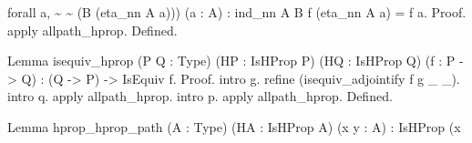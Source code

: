 \begin{coqdoccode}
\begin{coqdoccomment}
forall\coqdocindent{0.50em}
a,\coqdocindent{0.50em}
\~{}\coqdocindent{0.50em}
\~{}\coqdocindent{0.50em}
(B\coqdocindent{0.50em}
(eta\_nn\coqdocindent{0.50em}
A\coqdocindent{0.50em}
a)))\coqdocindent{0.50em}
(a\coqdocindent{0.50em}
:\coqdocindent{0.50em}
A)\coqdocindent{0.50em}
:\coqdoceol
\coqdocindent{2.00em}
ind\_nn\coqdocindent{0.50em}
A\coqdocindent{0.50em}
B\coqdocindent{0.50em}
f\coqdocindent{0.50em}
(eta\_nn\coqdocindent{0.50em}
A\coqdocindent{0.50em}
a)\coqdocindent{0.50em}
=\coqdocindent{0.50em}
f\coqdocindent{0.50em}
a.\coqdoceol
Proof.\coqdoceol
\coqdocindent{1.00em}
apply\coqdocindent{0.50em}
allpath\_hprop.\coqdoceol
Defined.\coqdoceol
\end{coqdoccomment}
\coqdoceol
\coqdocemptyline
\coqdocnoindent
\begin{coqdoccomment}
\coqdoceol
Lemma\coqdocindent{0.50em}
isequiv\_hprop\coqdocindent{0.50em}
(P\coqdocindent{0.50em}
Q\coqdocindent{0.50em}
:\coqdocindent{0.50em}
Type)\coqdocindent{0.50em}
(HP\coqdocindent{0.50em}
:\coqdocindent{0.50em}
IsHProp\coqdocindent{0.50em}
P)\coqdocindent{0.50em}
(HQ\coqdocindent{0.50em}
:\coqdocindent{0.50em}
IsHProp\coqdocindent{0.50em}
Q)\coqdoceol
\coqdocindent{3.00em}
(f\coqdocindent{0.50em}
:\coqdocindent{0.50em}
P\coqdocindent{0.50em}
->\coqdocindent{0.50em}
Q)\coqdocindent{0.50em}
:\coqdoceol
\coqdocindent{1.00em}
(Q\coqdocindent{0.50em}
->\coqdocindent{0.50em}
P)\coqdocindent{0.50em}
->\coqdocindent{0.50em}
IsEquiv\coqdocindent{0.50em}
f.\coqdoceol
Proof.\coqdoceol
\coqdocindent{1.00em}
intro\coqdocindent{0.50em}
g.\coqdoceol
\coqdocindent{1.00em}
refine\coqdocindent{0.50em}
(isequiv\_adjointify\coqdocindent{0.50em}
f\coqdocindent{0.50em}
g\coqdocindent{0.50em}
\_\coqdocindent{0.50em}
\_).\coqdoceol
\coqdocindent{1.00em}
intro\coqdocindent{0.50em}
q.\coqdocindent{0.50em}
apply\coqdocindent{0.50em}
allpath\_hprop.\coqdoceol
\coqdocindent{1.00em}
intro\coqdocindent{0.50em}
p.\coqdocindent{0.50em}
apply\coqdocindent{0.50em}
allpath\_hprop.\coqdoceol
Defined.\coqdoceol
\end{coqdoccomment}
\coqdoceol
\coqdocemptyline
\coqdocnoindent
\begin{coqdoccomment}
\coqdoceol
Lemma\coqdocindent{0.50em}
hprop\_hprop\_path\coqdocindent{0.50em}
(A\coqdocindent{0.50em}
:\coqdocindent{0.50em}
Type)\coqdocindent{0.50em}
(HA\coqdocindent{0.50em}
:\coqdocindent{0.50em}
IsHProp\coqdocindent{0.50em}
A)\coqdocindent{0.50em}
(x\coqdocindent{0.50em}
y\coqdocindent{0.50em}
:\coqdocindent{0.50em}
A)\coqdocindent{0.50em}
:\coqdocindent{0.50em}
IsHProp\coqdocindent{0.50em}
(x\coqdocindent{0.50em}

\end{coqdoccomment}
\end{coqdoccode}
